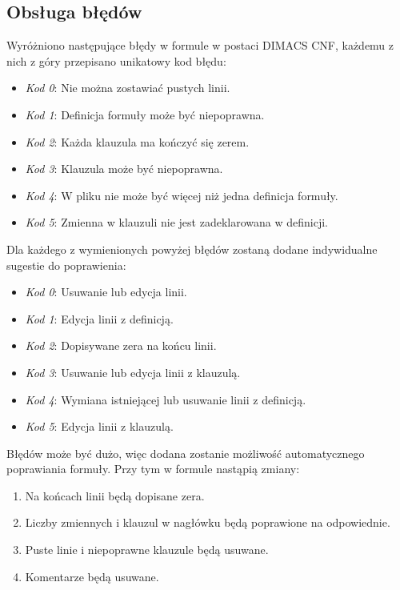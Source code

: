 \documentclass[a4paper,12pt]{book}
\theoremstyle{definition}
\begin{document}
\subsection{Obsługa błędów}

Wyróżniono następujące błędy w formule w postaci DIMACS CNF, każdemu z nich z góry przepisano unikatowy kod błędu:

\begin{itemize}
    \item \textit{Kod 0}: Nie można zostawiać pustych linii.
    \item \textit{Kod 1}: Definicja formuły może być niepoprawna.
    \item \textit{Kod 2}: Każda klauzula ma kończyć się zerem.
    \item \textit{Kod 3}: Klauzula może być niepoprawna.
    \item \textit{Kod 4}: W pliku nie może być więcej niż jedna definicja formuły.
    \item \textit{Kod 5}: Zmienna w klauzuli nie jest zadeklarowana w definicji.
\end{itemize}

\noindent Dla każdego z wymienionych powyżej błędów zostaną dodane indywidualne sugestie do poprawienia:

\begin{itemize}
    \item \textit{Kod 0}: Usuwanie lub edycja linii.
    \item \textit{Kod 1}: Edycja linii z definicją.
    \item \textit{Kod 2}: Dopisywane zera na końcu linii.
    \item \textit{Kod 3}: Usuwanie lub edycja linii z klauzulą.
    \item \textit{Kod 4}: Wymiana istniejącej lub usuwanie linii z definicją.
    \item \textit{Kod 5}: Edycja linii z klauzulą.
\end{itemize}

Błędów może być dużo, więc dodana zostanie możliwość automatycznego poprawiania formuły. Przy tym w formule nastąpią zmiany:

\begin{enumerate}
    \item Na końcach linii będą dopisane zera.
    \item Liczby zmiennych i klauzul w nagłówku będą poprawione na odpowiednie.
    \item Puste linie i niepoprawne klauzule będą usuwane.
    \item Komentarze będą usuwane.
\end{enumerate}
\end{document}
